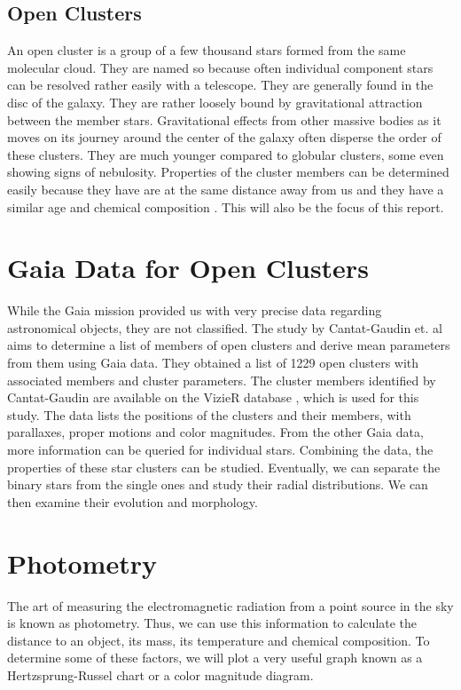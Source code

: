 \subsection{Open Clusters}
An open cluster is a group of a few thousand stars formed from the same molecular cloud. They are named so because often individual component stars can be resolved rather easily with a telescope. They are generally found in the disc of the galaxy. They are rather loosely bound by gravitational attraction between the member stars. Gravitational effects from other massive bodies as it moves on its journey around the center of the galaxy often disperse the order of these clusters. They are much younger compared to globular clusters, some even showing signs of nebulosity. Properties of the cluster members can be determined easily because they have are at the same distance away from us and they have a similar age and chemical composition \citep{openclust}. This will also be the focus of this report.

\section{Gaia Data for Open Clusters}
While the Gaia mission provided us with very precise data regarding astronomical objects, they are not classified. The study by Cantat-Gaudin et. al \citep{cg} aims to determine a list of members of open clusters and derive mean parameters from them using Gaia data. They obtained a list of 1229 open clusters with associated members and cluster parameters. The cluster members identified by Cantat-Gaudin are available on the VizieR database \citep{vizier}, which is used for this study. The data lists the positions of the clusters and their members, with parallaxes, proper motions and color magnitudes. From the other Gaia data, more information can be queried for individual stars. Combining the data, the properties of these star clusters can be studied. Eventually, we can separate the binary stars from the single ones and study their radial distributions. We can then examine their evolution and morphology.

\section{Photometry}
The art of measuring the electromagnetic radiation from a point source in the sky is known as photometry. Thus, we can use this information to calculate the distance to an object, its mass, its temperature and chemical composition. To determine some of these factors, we will plot a very useful graph known as a Hertzsprung-Russel chart or a color magnitude diagram.


